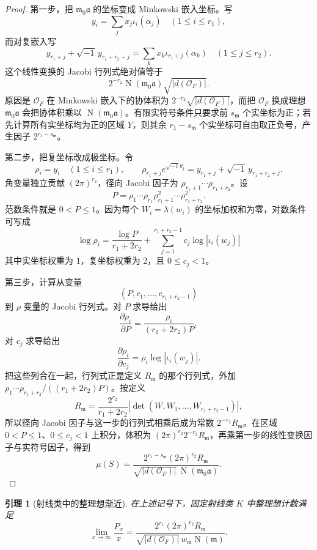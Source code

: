 \documentclass[11pt,a4paper,openany]{ctexbook}
\numberwithin{equation}{chapter}
\newcommand{\OF}{\mathcal{O}_F}
\newcommand{\Nm}{\operatorname{N}}
\theoremstyle{plain}
\newtheorem{lemma}[theorem]{引理}
\theoremstyle{definition}
\theoremstyle{remark}
\begin{document}
\begin{proof}
第一步，把 $\mathfrak m_0\mathfrak a$ 的坐标变成 Minkowski 嵌入坐标。写
\[
y_i=\sum_j x_j\iota_i(\alpha_j)\quad(1\le i\le r_1),
\]
而对复嵌入写
\[
y_{r_1+j}+\sqrt{-1}\,y_{r_1+r_2+j}
=\sum_k x_k\iota_{r_1+j}(\alpha_k)\quad(1\le j\le r_2).
\]
这个线性变换的 Jacobi 行列式绝对值等于
\[
2^{-r_2}\Nm(\mathfrak m_0\mathfrak a)\sqrt{|d(\OF)|}.
\]
原因是 $\OF$ 在 Minkowski 嵌入下的协体积为
$2^{-r_2}\sqrt{|d(\OF)|}$，而把 $\OF$ 换成理想
$\mathfrak m_0\mathfrak a$ 会把协体积乘以
$\Nm(\mathfrak m_0\mathfrak a)$。有限实符号条件只要求前
$s_{\mathfrak m}$ 个实坐标为正；若先计算所有实坐标均为正的区域 $Y$，则其余
$r_1-s_{\mathfrak m}$ 个实坐标可自由取正负号，产生因子
$2^{r_1-s_{\mathfrak m}}$。

第二步，把复坐标改成极坐标。令
\[
\rho_i=y_i\quad(1\le i\le r_1),\qquad
\rho_{r_1+j}e^{\sqrt{-1}\theta_j}
=y_{r_1+j}+\sqrt{-1}\,y_{r_1+r_2+j}.
\]
角变量独立贡献 $(2\pi)^{r_2}$，径向 Jacobi 因子为
$\rho_{r_1+1}\cdots\rho_{r_1+r_2}$。设
\[
P=\rho_1\cdots\rho_{r_1}\rho_{r_1+1}^2\cdots\rho_{r_1+r_2}^2.
\]
范数条件就是 $0<P\le1$。因为每个 $W_i=\lambda(w_i)$ 的坐标加权和为零，对数条件可写成
\[
\log \rho_i=\frac{\log P}{r_1+2r_2}
 +\sum_{j=1}^{r_1+r_2-1} c_j\log |\iota_i(w_j)|
\]
其中实坐标权重为 $1$，复坐标权重为 $2$，且 $0\le c_j<1$。

第三步，计算从变量
\[
(P,c_1,\dots,c_{r_1+r_2-1})
\]
到 $\rho$ 变量的 Jacobi 行列式。对 $P$ 求导给出
\[
\frac{\partial \rho_i}{\partial P}
=\frac{\rho_i}{(r_1+2r_2)P},
\]
对 $c_j$ 求导给出
\[
\frac{\partial \rho_i}{\partial c_j}
=\rho_i\log |\iota_i(w_j)|.
\]
把这些列合在一起，行列式正是定义 $R_{\mathfrak m}$ 的那个行列式，外加
$\rho_1\cdots\rho_{r_1+r_2}/((r_1+2r_2)P)$。按定义
\[
R_{\mathfrak m}
=\frac{2^{r_2}}{r_1+2r_2}
\left|\det(W,W_1,\dots,W_{r_1+r_2-1})\right|,
\]
所以径向 Jacobi 因子与这一步的行列式相乘后成为常数
$2^{-r_2}R_{\mathfrak m}$。在区域
$0<P\le1$、$0\le c_j<1$ 上积分，体积为
$(2\pi)^{r_2}2^{-r_2}R_{\mathfrak m}$，再乘第一步的线性变换因子与实符号因子，得到
\[
\mu(S)=
\frac{2^{r_1-s_{\mathfrak m}}(2\pi)^{r_2}R_{\mathfrak m}}
{\sqrt{|d(\OF)|}\,\Nm(\mathfrak m_0\mathfrak a)}.
\]
\end{proof}

\begin{lemma}[射线类中的整理想渐近]
在上述记号下，固定射线类 $K$ 中整理想计数满足
\[
\lim_{x\to\infty}\frac{P_x}{x}
=
\frac{2^{r_1}(2\pi)^{r_2}R_{\mathfrak m}}
{\sqrt{|d(\OF)|}\,w_{\mathfrak m}\Nm(\mathfrak m)}.
\]
\end{lemma}
\end{document}
